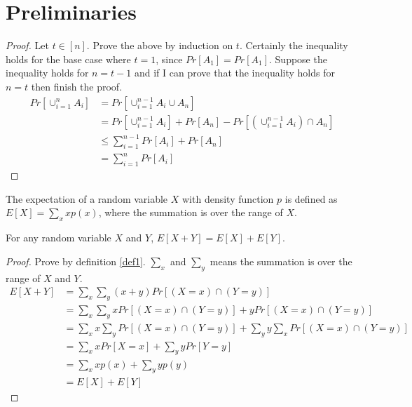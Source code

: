 \section{Preliminaries}
\begin{proof}
Let $t \in [n]$.
Prove the above by induction on $t$.
Certainly the inequality holds for the base case where $t=1$, since $Pr[A_1]=Pr[A_1]$.
Suppose the inequality holds for $n=t-1$ and if I can prove that the inequality holds for $n=t$ then finish the proof.
\begin{align}
    \nonumber Pr[\cup_{i=1}^{n}A_i]&=Pr[\cup_{i=1}^{n-1}A_i\cup A_n]\\
    \nonumber&= Pr[\cup_{i=1}^{n-1}A_i]+Pr[A_n]-Pr[(\cup_{i=1}^{n-1}A_i)\cap A_n]\\
    \nonumber&\le \sum_{i=1}^{n-1}Pr[A_i]+Pr[A_n]\\
    \nonumber&=\sum_{i=1}^{n}Pr[A_i]
\end{align}
\end{proof}
\noindent{}
\cite{linearity}
\begin{definition}\label{def1}
The expectation of a random variable $X$ with density function $p$ is defined as $E[X] = \sum_x xp(x)$, where the summation is over the range of $X$.
\end{definition}
\begin{lemma}\label{lemma2}
For any random variable $X$ and $Y$, $E[X+Y]=E[X]+E[Y]$.
\end{lemma}
\begin{proof}
Prove by definition \ref{def1}.
$\sum_x$ and $\sum_y$ means the summation is over the range of $X$ and $Y$.
\begin{align}
    \nonumber E[X+Y]&=\sum_x\sum_y(x+y)Pr[(X=x)\cap(Y=y)]\\
    \nonumber&=\sum_x\sum_yxPr[(X=x)\cap(Y=y)]+yPr[(X=x)\cap(Y=y)]\\
    \nonumber&=\sum_xx\sum_yPr[(X=x)\cap(Y=y)]+\sum_yy\sum_xPr[(X=x)\cap(Y=y)]\\
    \nonumber&=\sum_xxPr[X=x]+\sum_yyPr[Y=y]\\
    \nonumber&=\sum_xxp(x)+\sum_yyp(y)\\
    \nonumber&=E[X]+E[Y]
\end{align}
\end{proof}
